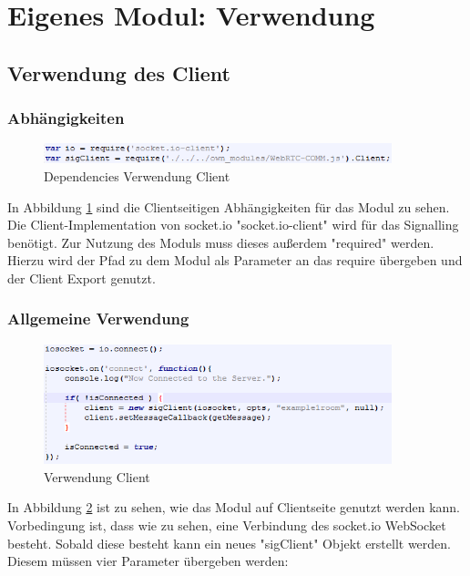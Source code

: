 \section{Eigenes Modul: Verwendung}

\subsection{Verwendung des Client}

\subsubsection{Abhängigkeiten}
\begin{figure}[htH]
\centering
\includegraphics[width=0.9\textwidth]{backend/Modul_UserClientDependencies.PNG}
\caption{Dependencies Verwendung Client}
\label{backfig10}
\end{figure}
In Abbildung \ref{backfig10} sind die Clientseitigen Abhängigkeiten für das Modul zu sehen.
Die Client-Implementation von socket.io "socket.io-client" wird für das Signalling benötigt.
Zur Nutzung des Moduls muss dieses außerdem "required" werden. Hierzu wird der Pfad zu dem Modul als Parameter an das require übergeben und der Client Export genutzt.



\subsubsection{Allgemeine Verwendung}
\begin{figure}[htH]
\centering
\includegraphics[width=0.9\textwidth]{backend/Modul_UserClientHowTo.PNG}
\caption{Verwendung Client}
\label{backfig11}
\end{figure}
In Abbildung \ref{backfig11} ist zu sehen, wie das Modul auf Clientseite genutzt werden kann.
Vorbedingung ist, dass wie zu sehen, eine Verbindung des socket.io WebSocket besteht.
Sobald diese besteht kann ein neues "sigClient" Objekt erstellt werden.
Diesem müssen vier Parameter übergeben werden:

